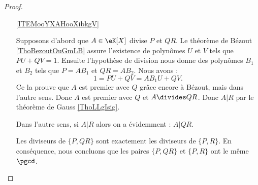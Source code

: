 \begin{proof}
\begin{enumerate}

\item[\ref{ITEMooYXAHooXibkgV}]

Supposons d'abord que \( A\in \eK[X]\) divise \( P\) et \( QR\). Le théorème de Bézout \ref{ThoBezoutOuGmLB} assure l'existence de polynômes $U$ et $V$ tels que $PU+QV=1$. Ensuite l'hypothèse de division nous donne des polynômes \( B_1\) et \( B_2\) tels que $P=AB_1$ et $QR=AB_2$.  Nous avons :
            \begin{equation}
                    1=PU+QV=AB_1U+QV.
            \end{equation}
            Ce la prouve que \( A\) est premier avec $Q$ grâce encore à Bézout, mais dans l'autre sens. Donc \( A\) est premier avec \( Q\) et \( A\divides QR\). Donc \( A|R\) par le théorème de Gauss \ref{ThoLLgIsig}.
                   
    Dans l'autre sens, si $A|R$ alors on a évidemment : $A|QR$.

    Les diviseurs de $\{P,QR\}$ sont exactement les diviseurs de $\{P,R\}$. En conséquence, nous concluons que les paires $\{P,QR\}$ et $\{P,R\}$ ont le même $\pgcd$.

    \end{enumerate}

\end{proof}



